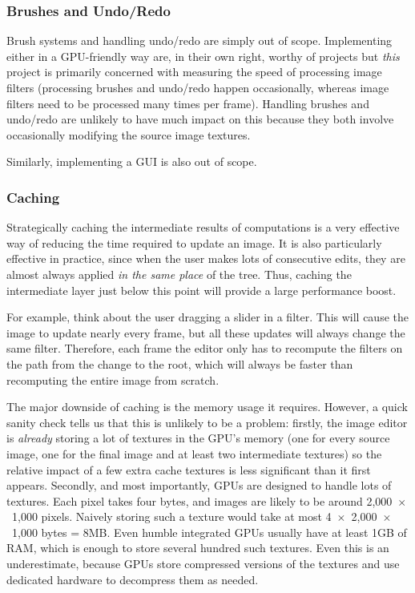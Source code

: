 \documentclass[12pt]{article}
\begin{document}
\subsubsection{Brushes and Undo/Redo}

Brush systems and handling undo/redo are simply out of scope.  Implementing either in a GPU-friendly
way are, in their own right, worthy of projects but \emph{this} project is primarily concerned with
measuring the speed of processing image filters (processing brushes and undo/redo happen
occasionally, whereas image filters need to be processed many times per frame).  Handling brushes
and undo/redo are unlikely to have much impact on this because they both involve occasionally
modifying the source image textures.

Similarly, implementing a GUI is also out of scope.

\subsubsection{Caching}

Strategically caching the intermediate results of computations is a very effective way of reducing
the time required to update an image.  It is also particularly effective in practice, since when the
user makes lots of consecutive edits, they are almost always applied \emph{in the same place} of the
tree.  Thus, caching the intermediate layer just below this point will provide a large performance
boost.

For example, think about the user dragging a slider in a filter.  This will cause the image to
update nearly every frame, but all these updates will always change the same filter.  Therefore,
each frame the editor only has to recompute the filters on the path from the change to the root,
which will always be faster than recomputing the entire image from scratch.

The major downside of caching is the memory usage it requires.  However, a quick sanity check tells
us that this is unlikely to be a problem: firstly, the image editor is \emph{already} storing a lot
of textures in the GPU's memory (one for every source image, one for the final image and at least
two intermediate textures) so the relative impact of a few extra cache textures is less significant
than it first appears.  Secondly, and most importantly, GPUs are designed to handle lots of
textures.  Each pixel takes four bytes, and images are likely to be around 2,000~$\times$~1,000
pixels.  Naively storing such a texture would take at most 4~$\times$~2,000~$\times$~1,000 bytes =
8MB.  Even humble integrated GPUs usually have at least 1GB of RAM, which is enough to store several
hundred such textures.  Even this is an underestimate, because GPUs store compressed versions of the
textures and use dedicated hardware to decompress them as needed.
\end{document}
